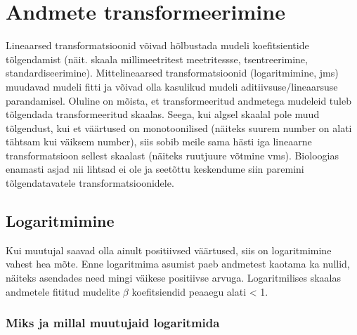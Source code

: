 \documentclass[]{book}
\begin{document}
\hypertarget{andmete-transformeerimine}{%
\chapter{Andmete transformeerimine}\label{andmete-transformeerimine}}

Lineaarsed transformatsioonid võivad hõlbustada mudeli koefitsientide tõlgendamist (näit. skaala millimeetritest meetritessse, tsentreerimine, standardiseerimine). Mittelineaarsed transformatsioonid (logaritmimine, jms) muudavad mudeli fitti ja võivad olla kasulikud mudeli aditiivsuse/lineaarsuse parandamisel. Oluline on mõista, et transformeeritud andmetega mudeleid tuleb tõlgendada transformeeritud skaalas. Seega, kui algsel skaalal pole muud tõlgendust, kui et väärtused on monotoonilised (näiteks suurem number on alati tähtsam kui väiksem number), siis sobib meile sama hästi iga lineaarne transformatsioon sellest skaalast (näiteks ruutjuure võtmine vms). Bioloogias enamasti asjad nii lihtsad ei ole ja seetõttu keskendume siin paremini tõlgendatavatele transformatsioonidele.

\hypertarget{logaritmimine}{%
\section{Logaritmimine}\label{logaritmimine}}

Kui muutujal saavad olla ainult positiivsed väärtused, siis on logaritmimine vahest hea mõte. Enne logaritmima asumist paeb andmetest kaotama ka nullid, näiteks asendades need mingi väikese positiivse arvuga. Logaritmilises skaalas andmetele fititud mudelite \(\beta\) koefitsiendid peaaegu alati \textless{} 1.

\hypertarget{miks-ja-millal-muutujaid-logaritmida}{%
\subsection*{Miks ja millal muutujaid logaritmida}\label{miks-ja-millal-muutujaid-logaritmida}}
\end{document}
